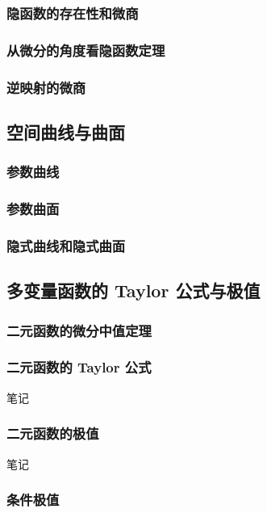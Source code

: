 \subsubsection{隐函数的存在性和微商}
\subsubsection{从微分的角度看隐函数定理}
\subsubsection{逆映射的微商}

\subsection{空间曲线与曲面}
\subsubsection{参数曲线}
\subsubsection{参数曲面}
\subsubsection{隐式曲线和隐式曲面}

\subsection{多变量函数的 Taylor 公式与极值}

\subsubsection{二元函数的微分中值定理}

\subsubsection{二元函数的 Taylor 公式}

笔记

\subsubsection{二元函数的极值}

笔记

\subsubsection{条件极值}

